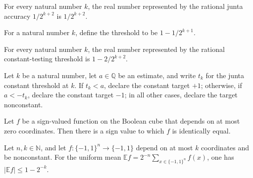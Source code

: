\begin{theorem}
\label{FABL.juntaConstantAccuracy_cast}
\leanok
{}
For every natural number $k$, the real number represented by the rational junta accuracy
$1/2^{k+2}$ is $1/2^{k+2}$.
\end{theorem}

\begin{definition}
\label{FABL.juntaConstantThreshold}
\leanok
{}
For a natural number $k$, define the threshold to be $1-1/2^{k+1}$.
\end{definition}

\begin{theorem}
\label{FABL.juntaConstantThreshold_cast}
\leanok
{}
For every natural number $k$, the real number represented by the rational
constant-testing threshold is $1-2/2^{k+2}$.
\end{theorem}

\begin{definition}
\label{FABL.decideJuntaConstant}
\leanok
{}
Let $k$ be a natural number, let $a\in\mathbb Q$ be an estimate, and write $t_k$ for the
junta constant threshold at $k$. If $t_k<a$, declare the constant target $+1$;
otherwise, if $a<-t_k$, declare the constant target $-1$; in all other cases, declare
the target nonconstant.
\end{definition}

\begin{theorem}
\label{FABL.exists_eq_const_of_isKJunta_zero}
\leanok
{}
Let $f$ be a sign-valued function on the Boolean cube that depends on at most zero
coordinates. Then there is a sign value to which $f$ is identically equal.
\end{theorem}

\begin{theorem}
\label{FABL.abs_mean_le_one_sub_inv_two_pow_of_isKJunta_of_nonconstant}
\leanok
{}
Let $n,k\in\mathbb N$, and let $f\colon\{-1,1\}^n\to\{-1,1\}$ depend on at most $k$
coordinates and be nonconstant. For the uniform mean $\mathbb E
f=2^{-n}\sum_{x\in\{-1,1\}^n}f(x)$, one has $|\mathbb E f|\leq 1-2^{-k}$.
\end{theorem}

